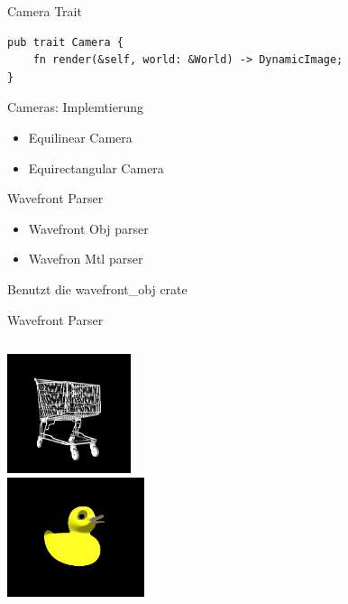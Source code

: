 \documentclass{beamer}
\begin{document}
\begin{frame}[fragile]{Camera Trait}
    \begin{lstlisting}
pub trait Camera {
    fn render(&self, world: &World) -> DynamicImage;
}
    \end{lstlisting}
\end{frame}

\begin{frame}{Cameras: Implemtierung}
    \begin{itemize}[<+->]
        \item Equilinear Camera
        \item Equirectangular Camera
    \end{itemize}
\end{frame}

\begin{frame}{Wavefront Parser}
    \begin{itemize}[<+->]
        \item Wavefront Obj parser
        \item Wavefron Mtl parser
    \end{itemize}
    Benutzt die wavefront_obj crate
\end{frame}

\begin{frame}{Wavefront Parser}
    \begin{columns}[t]
        \centering
        \includegraphics[height=3.5cm]{example-cart} \\
        \includegraphics[height=3.5cm]{example-duck}
        \centering
    \end{columns}

\end{frame}
\end{document}
